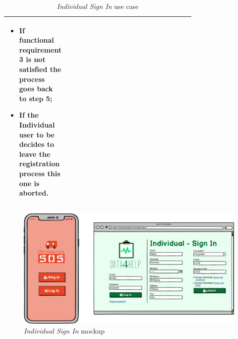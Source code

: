 \begin{center}
\begin{table}
\begin{tabular}{ | l | p{0.75\linewidth} | }
\begin{minipage}[t]{0.7\textwidth}
\begin{itemize}
      \item If functional requirement 3 is not satisfied the process goes back to step 5;
      \item If the \textbf{Individual user to be} decides to leave the registration process this one is aborted.
    \end{itemize}
    \smallskip
  \end{minipage}  \\ \hline
\end{tabular}
\caption{\textit{Individual Sign In} use case}
\label{table:individualSignInTable}
\end{table}
\end{center}

\begin{figure}
\begin{center}
  \includegraphics[width=\textwidth]{img/mockup/Individual_SingIn.png}
  \hspace{0.05\linewidth}
  \centering
  \caption{\textit{Individual Sign In} mockup}
  \label{img:individualSignInMockup}
\end{center}
\end{figure}
